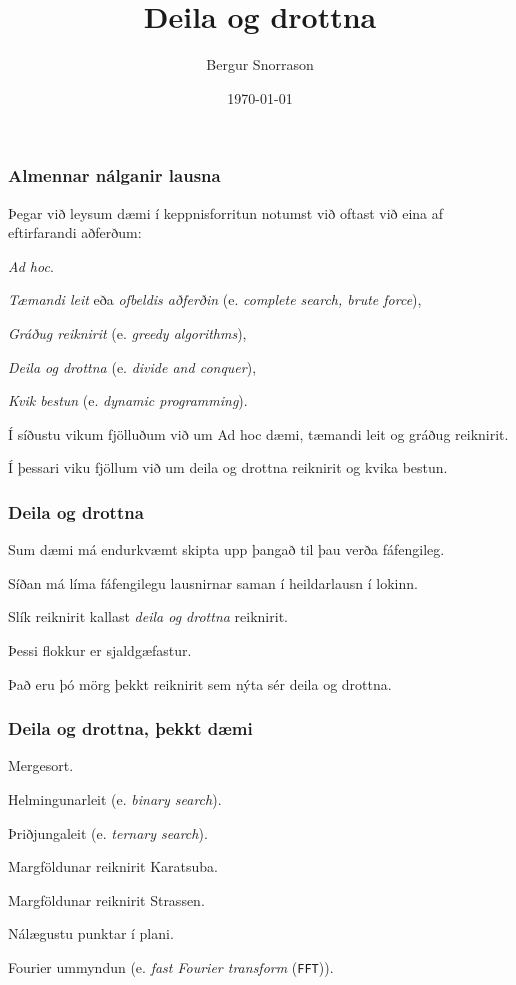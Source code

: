 \title{Deila og drottna}
\author{Bergur Snorrason}
\date{\today}



\frame{\titlepage}

{
	\frametitle{Almennar nálganir lausna}
	{
		\item<1-> Þegar við leysum dæmi í keppnisforritun notumst við oftast við eina af eftirfarandi aðferðum:
		{
			\item<2-> \emph{Ad hoc}.
			\item<3-> \emph{Tæmandi leit} eða \emph{ofbeldis aðferðin} (e. \emph{complete search, brute force}),
			\item<4-> \emph{Gráðug reiknirit} (e. \emph{greedy algorithms}),
			\item<5-> \emph{Deila og drottna} (e. \emph{divide and conquer}),
			\item<6-> \emph{Kvik bestun} (e. \emph{dynamic programming}).
		}
		\item<7-> Í síðustu vikum fjölluðum við um Ad hoc dæmi, tæmandi leit og gráðug reiknirit.
		\item<8-> Í þessari viku fjöllum við um deila og drottna reiknirit og kvika bestun.
	}
}

{
	\frametitle{Deila og drottna}
	{
		\item<1-> Sum dæmi má endurkvæmt skipta upp þangað til þau verða fáfengileg.
		\item<2-> Síðan má líma fáfengilegu lausnirnar saman í heildarlausn í lokinn.
		\item<3-> Slík reiknirit kallast \emph{deila og drottna} reiknirit.
		\item<4-> Þessi flokkur er sjaldgæfastur.
		\item<5-> Það eru þó mörg þekkt reiknirit sem nýta sér deila og drottna.
	}
}

{
	\frametitle{Deila og drottna, þekkt dæmi}
	{
		\item<1-> Mergesort.
		\item<2-> Helmingunarleit (e. \emph{binary search}).
		\item<3-> Þriðjungaleit (e. \emph{ternary search}).
		\item<4-> Margföldunar reiknirit Karatsuba.
		\item<5-> Margföldunar reiknirit Strassen.
		\item<6-> Nálægustu punktar í plani.
		\item<7-> Fourier ummyndun (e. \emph{fast Fourier transform} (\texttt{FFT})).
	}
}

